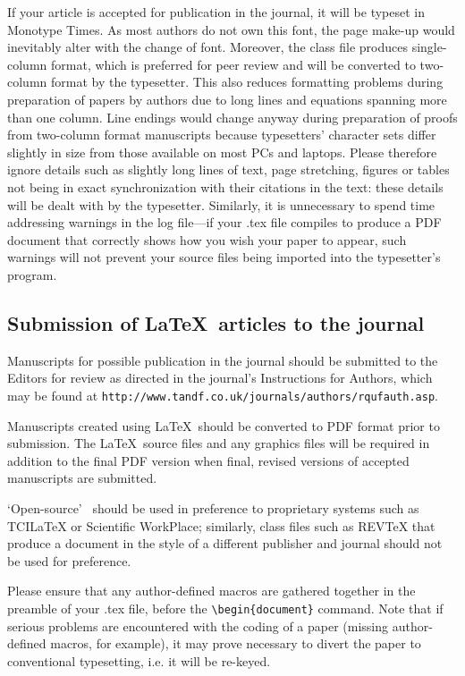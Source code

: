 \documentclass{rQUF2e}
\theoremstyle{plain}
\theoremstyle{definition}
\theoremstyle{remark}
\begin{document}
If your article is accepted for publication in the journal, it will be typeset in Monotype Times. As most authors do not own this font, the page make-up would inevitably alter with the change of font. Moreover, the class file produces single-column format, which is preferred for peer review and will be converted to two-column format by the typesetter. This also reduces formatting problems during preparation of papers by authors due to long lines and equations spanning more than one column. Line endings would change anyway during preparation of proofs from two-column format manuscripts because typesetters' character sets differ slightly in size from those available on most PCs and laptops. Please therefore ignore details such as slightly long lines of text, page stretching, figures or tables not being in exact synchronization with their citations in the text: these details will be dealt with by the typesetter. Similarly, it is unnecessary to spend time addressing warnings in the log file---if your .tex file compiles to produce a PDF document that correctly shows how you wish your paper to appear, such warnings will not prevent your source files being imported into the typesetter's program.


\subsection{Submission of \LaTeX\ articles to the journal}\label{submission}

Manuscripts for possible publication in the journal should be submitted to the Editors for review as directed in the journal's Instructions for Authors, which may be found at \texttt{http://www.tandf.co.uk/journals/authors/rqufauth.asp}.

Manuscripts created using \LaTeX\ should be converted to PDF format prior to submission. The \LaTeX\ source files and any graphics files will be required in addition to the final PDF version when final, revised versions of accepted manuscripts are submitted.

`Open-source' \LaTeXe\ should be used in preference to proprietary systems such as TCILaTeX or Scientific WorkPlace; similarly, class files such as REVTeX that produce a document in the style of a different publisher and journal should not be used for preference.

Please ensure that any author-defined macros are gathered together in the preamble of your .tex file, before the
\verb"\begin{document}" command. Note that if serious problems are encountered with the coding of a paper (missing author-defined macros,
for example), it may prove necessary to divert the paper to conventional typesetting, i.e. it will be re-keyed.
\end{document}
